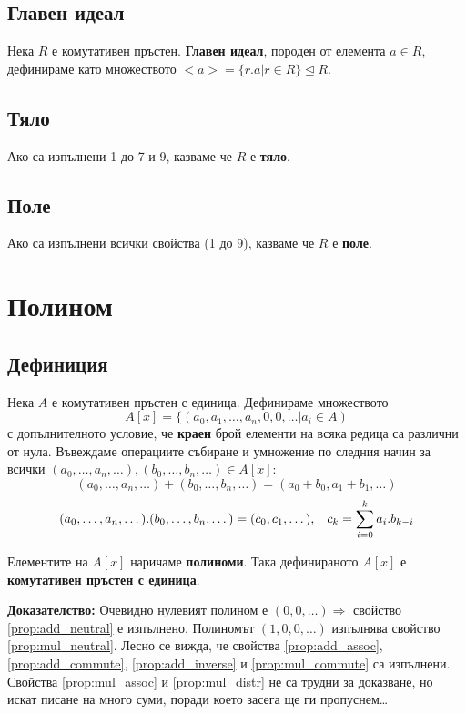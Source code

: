 \documentclass[fleqn,12pt]{article}
\begin{document}
\subsection{Главен идеал}
Нека $R$ е комутативен пръстен. \textbf{Главен идеал}, породен от елемента $a \in R$,
дефинираме като множеството $<a> = \{r.a | r \in R\} \trianglelefteq R$.

\subsection{Тяло}
Ако са изпълнени 1 до 7 и 9, казваме че $R$ е \textbf{тяло}.

\subsection{Поле}
Ако са изпълнени всички свойства (1 до 9), казваме че $R$ е \textbf{поле}.

\section{Полином}
\subsection{Дефиниция}
Нека $A$ е комутативен пръстен с единица.
Дефинираме множеството 
\[ A[x] = \{(a_0, a_1, \dots, a_n, 0, 0, \dots | a_i \in A) \] 
с
допълнителното условие, че \textbf{краен} брой елементи на всяка редица са различни от нула.
Въвеждаме операциите събиране и умножение по следния начин за всички $(a_0, \dots, a_n, \dots), (b_0, \dots, b_n, \dots) \in A[x]$:
\[(a_0, \dots, a_n, \dots) + (b_0, \dots, b_n, \dots) = (a_0 + b_0, a_1 + b_1, \dots) \]
\[(a_0, \dots, a_n, \dots) . (b_0, \dots, b_n, \dots) = (c_0, c_1, \dots), \hspace{3mm}
c_k = \sum_{i=0}^{k} a_i . b_{k - i} \]

Елементите на $A[x]$ наричаме \textbf{полиноми}. Така дефинираното $A[x]$ е \textbf{комутативен пръстен с единица}.

\textbf{Доказателство:} Очевидно нулевият полином е $(0, 0, \dots) \Rightarrow$ свойство \ref{prop:add_neutral} е изпълнено.
Полиномът $(1, 0, 0, \dots)$ изпълнява свойство \ref{prop:mul_neutral}. Лесно се вижда, че свойства \ref{prop:add_assoc}, \ref{prop:add_commute}, 
\ref{prop:add_inverse} и \ref{prop:mul_commute} са изпълнени. Свойства \ref{prop:mul_assoc} и \ref{prop:mul_distr} не са трудни за доказване, 
но искат писане на много суми, поради което засега ще ги пропуснем\dots
\end{document}
